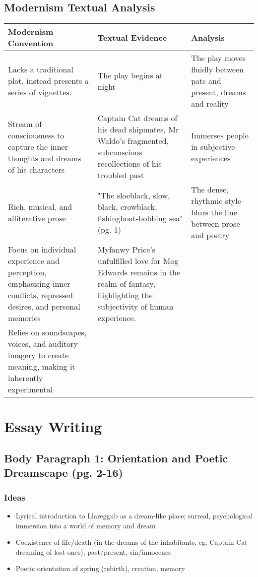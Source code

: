 	\subsection{Modernism Textual Analysis}

		\begin{table}[H]
			\centering
			\begin{tabular}{p{5cm}|p{5cm}|p{5cm}}
				\textbf{Modernism Convention} & \textbf{Textual Evidence} & \textbf{Analysis} \\ \hline
				Lacks a traditional plot, instead presents a series of vignettes. & The play begins at night & The play moves fluidly between pats and present, dreams and reality \\
				Stream of consciousness to capture the inner thoughts and dreams of his characters & Captain Cat dreams of his dead shipmates, Mr Waldo's fragmented, subconscious recollections of his troubled past & Immerses people in subjective experiences \\
				Rich, musical, and alliterative prose & "The sloeblack, slow, black, crowblack, fishingboat-bobbing sea" (pg. 1) & The dense, rhythmic style blurs the line between prose and poetry \\
				Focus on individual experience and perception, emphasising inner conflicts, repressed desires, and personal memories & Myfanwy Price's unfulfilled love for Mog Edwards remains in the realm of fantasy, highlighting the subjectivity of human experience. & \\
				Relies on soundscapes, voices, and auditory imagery to create meaning, making it inherently experimental & & 
			\end{tabular}
		\end{table}

\section{Essay Writing}

	\subsection{Body Paragraph 1: Orientation and Poetic Dreamscape (pg. 2-16)}

		\subsubsection{Ideas} 
			
			\begin{itemize}
				\item Lyrical introduction to Llareggub as a dream-like place; surreal, psychological immersion into a world of memory and dream
				\item Coexistence of life/death (in the dreams of the inhabitants, eg. Captain Cat dreaming of lost ones), past/present, sin/innocence
				\item Poetic orientation of spring (rebirth), creation, memory
			\end{itemize}

